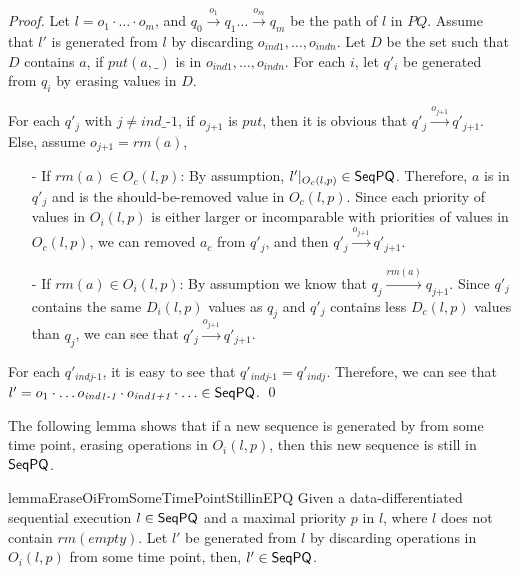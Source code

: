 \begin {proof}
Let $l=o_1 \cdot \ldots \cdot o_m$, and $q_0 \xrightarrow{o_1} q_1 \ldots \xrightarrow{o_m} q_m$ be the path of $l$ in $\textit{PQ}$. Assume that $l'$ is generated from $l$ by discarding $o_{\textit{ind1}},\ldots,o_{\textit{indn}}$. Let $D$ be the set such that $D$ contains $a$, if $\textit{put}(a,\_)$ is in $o_{\textit{ind1}},\ldots,o_{\textit{indn}}$. For each $i$, let $q'_i$ be generated from $q_i$ by erasing values in $D$.

For each $q'_j$ with $j \neq \textit{ind}\_\textit{-1}$, if $o_{\textit{j+1}}$ is $\textit{put}$, then it is obvious that $q'_j \xrightarrow{o_{\textit{j+1}}} q'_{\textit{j+1}}$. Else, assume $o_{\textit{j+1}} = \textit{rm}(a)$,

\begin{itemize}
\setlength{\itemsep}{0.5pt}
\item[-] If $\textit{rm}(a) \in O_c(l,p)$: By assumption, $l' \vert_{ O_c(l,p) } \in \mathsf{SeqPQ}$. Therefore, $a$ is in $q'_j$ and is the should-be-removed value in $O_c(l,p)$. Since each priority of values in $O_i(l,p)$ is either larger or incomparable with priorities of values in $O_c(l,p)$, we can removed $a_c$ from $q'_j$, and then $q'_j \xrightarrow{o_{\textit{j+1}}} q'_{\textit{j+1}}$.

\item[-] If $\textit{rm}(a) \in O_i(l,p)$: By assumption we know that $q_j \xrightarrow{\textit{rm}(a)} q_{\textit{j+1}}$. Since $q'_j$ contains the same $D_i(l,p)$ values as $q_j$ and $q'_j$ contains less $D_c(l,p)$ values than $q_j$, we can see that $q'_j \xrightarrow{o_{\textit{j+1}}} q'_{\textit{j+1}}$.
\end{itemize}

For each $q'_{\textit{indj-1}}$, it is easy to see that $q'_{\textit{indj-1}} = q'_{\textit{indj}}$. Therefore, we can see that $l' = o_1 \cdot \ldots o_{\textit{ind1-1}} \cdot o_{\textit{ind1+1}} \cdot \ldots \in \mathsf{SeqPQ}$. \qed
\end {proof}


The following lemma shows that if a new sequence is generated by from some time point, erasing operations in $O_i(l,p)$, then this new sequence is still in $\mathsf{SeqPQ}$.

\begin{restatable}{lemma}{EraseOiFromSomeTimePointStillinEPQ}
\label{lemma:erase Oi from some time point still in EPQ}
Given a data-differentiated sequential execution $l \in \mathsf{SeqPQ}$ and a maximal priority $p$ in $l$, where $l$ does not contain $\textit{rm}(\textit{empty})$. Let $l'$ be generated from $l$ by discarding operations in $O_i(l,p)$ from some time point, then, $l' \in \mathsf{SeqPQ}$.
\end{restatable}

